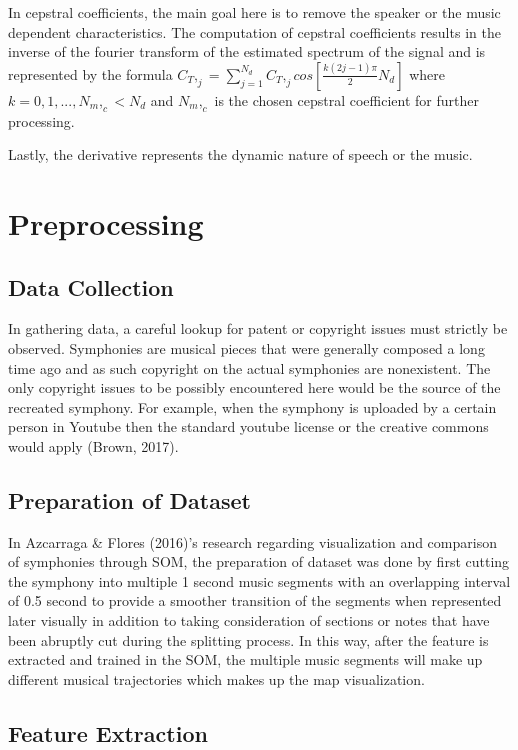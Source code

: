 In cepstral coefficients, the main goal here is to remove the speaker or the music dependent characteristics. The computation of cepstral coefficients results in the inverse of the fourier transform of the estimated spectrum of the signal and is represented by the formula $C_T,_j=\sum_{j=1}^{N_d} C_T,_j cos[\frac{k(2j-1)\pi}2N_d]$ where $k=0,1,...,N_m,_c<N_d$ and $N_m,_c$ is the chosen cepstral coefficient for further processing.

Lastly, the derivative represents the dynamic nature of speech or the music.

\section{Preprocessing}
\subsection{Data Collection}

In gathering data, a careful lookup for patent or copyright issues must strictly be observed. Symphonies are musical pieces that were generally composed a long time ago and as such copyright on the actual symphonies are nonexistent. The only copyright issues to be possibly encountered here would be the source of the recreated symphony. For example, when the symphony is uploaded by a certain person in Youtube then the standard youtube license or the creative commons would apply (Brown,  2017).

\subsection{Preparation of Dataset}

In Azcarraga \& Flores (2016)’s research regarding visualization and comparison of symphonies through SOM, the preparation of dataset was done by first cutting the symphony into multiple 1 second music segments with an overlapping interval of 0.5 second to provide a smoother transition of the segments when represented later visually in addition to taking consideration of sections or notes that have been abruptly cut during the splitting process. In this way, after the feature is extracted and trained in the SOM, the multiple music segments will make up different musical trajectories which makes up the map visualization.

\subsection{Feature Extraction}

